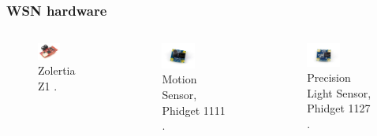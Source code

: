 \documentclass{beamer}
\begin{document}
\begin{frame}
\frametitle{WSN hardware}

	\begin{columns}

	
			\begin{figure}
				\includegraphics[width=0.5\textwidth]{z1.png}
				\caption{Zolertia Z1 \cite{z1}.}
			\end{figure}


			\begin{figure}
				\includegraphics[width=0.5\textwidth]{1111.jpg}
				\caption{Motion Sensor, Phidget 1111 \cite{1111}.}
			\end{figure}

			\begin{figure}
				\includegraphics[width=0.5\textwidth]{1127.jpg}
				\caption{Precision Light Sensor, Phidget 1127 \cite{1111}.}
			\end{figure}

	\end{columns}

\end{frame}
\end{document}
